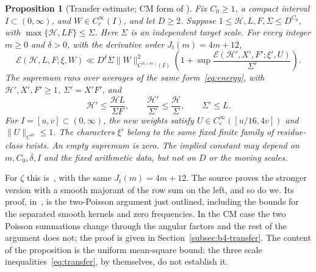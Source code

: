 \documentclass[11pt]{article}
\numberwithin{equation}{section}
\newcommand{\E}{\mathcal E}
\newtheorem{proposition}{Proposition}
\begin{document}
\begin{proposition}[Transfer estimate; CM form of {\cite[Proposition~5.4]{OAI1112}}]\label{prop:cm-transfer}
Fix $C_0\ge1$, a compact interval $I\subset(0,\infty)$,
and $W\in C_c^\infty(I)$, and let $D\ge2$. Suppose
$1\le\mathcal H,L,F,\Sigma\le D^{C_0}$, with
$\max\{\mathcal H,LF\}\le\Sigma$. Here $\Sigma$ is an independent
target scale. For every integer $m\ge0$ and $\delta>0$, with the
derivative order $J_t(m)=4m+12$,
\begin{equation}\label{eq:transferprop}
 \E(\mathcal H,L,F;\xi,W)
 \ll D^\delta\Sigma\|W\|_{C^{J_t(m)}(I)}^2
 \left(1+\sup\frac{\E(\mathcal H',X',F';\xi',U)}{\Sigma'}\right).
\end{equation}
The supremum runs over averages of the same form~\eqref{eq:energy}, with
$\mathcal H',X',F'\ge1$, $\Sigma'=X'F'$, and
\begin{equation}\label{eq:transfer}
 \mathcal H'\le\frac{\mathcal HL}{\Sigma F},\qquad
 \frac{\mathcal H'}{\Sigma'}\le\frac{\mathcal H}{\Sigma},\qquad
 \Sigma'\le L.
\end{equation}
For $I=[u,v]\subset(0,\infty)$, the new weights satisfy
$U\in C_c^\infty([u/16,4v])$ and $\|U\|_{C^m}\le1$.
The characters $\xi'$ belong to the same fixed finite family of
residue-class twists. An empty supremum is zero. The implied constant
may depend on $m,C_0,\delta,I$ and the fixed arithmetic data, but not
on $D$ or the moving scales.
\end{proposition}

For $\zeta$ this is~\cite[Proposition~5.4]{OAI1112}, with the same
$J_t(m)=4m+12$. The source proves the stronger version with a smooth
majorant of the row sum on the left, and so do we. Its proof,
in~\cite[Section~7]{OAI1112}, is the two-Poisson argument just
outlined, including the bounds for the separated smooth kernels and
zero frequencies. In the CM case the two Poisson summations change
through the angular factors and the rest of the argument does not; the
proof is given in Section~\ref{subsec:b4-transfer}. The content of the
proposition is the uniform mean-square bound: the three scale
inequalities~\eqref{eq:transfer}, by themselves, do not establish it.
\end{document}
